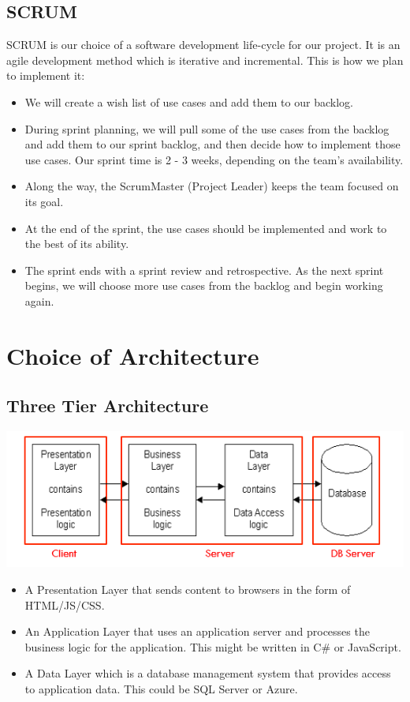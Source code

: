 \documentclass{article}
\begin{document}
\subsection*{SCRUM}
SCRUM is our choice of a software development life-cycle for our project. It is an agile development method which is iterative and incremental.
This is how we plan to implement it:
\begin{itemize}
\item We will create a wish list of use cases and add them to our backlog.
\item During sprint planning, we will pull some of the use cases from the backlog and add them to our sprint backlog, and then decide how to implement those use cases.
Our sprint time is 2 - 3 weeks, depending on the team's availability. 
\item Along the way, the ScrumMaster (Project Leader) keeps the team focused on its goal.
\item At the end of the sprint, the use cases should be implemented and work to the best of its ability. 
\item The sprint ends with a sprint review and retrospective.
As the next sprint begins, we will choose more use cases from the backlog and begin working again. \cite{Scrum}
\end{itemize}
\hfill

\section*{Choice of Architecture}
\subsection*{Three Tier Architecture}
\includegraphics[scale=1]{Capture2.png} 
\begin{itemize}
\item A Presentation Layer that sends content to browsers in the form of HTML/JS/CSS. 
\item An Application Layer that uses an application server and processes the business logic for the application. This might be written in C\# or JavaScript.
\item A Data Layer which is a database management system that provides access to application data. This could be SQL Server or Azure. \\
\end{itemize}
\end{document}
